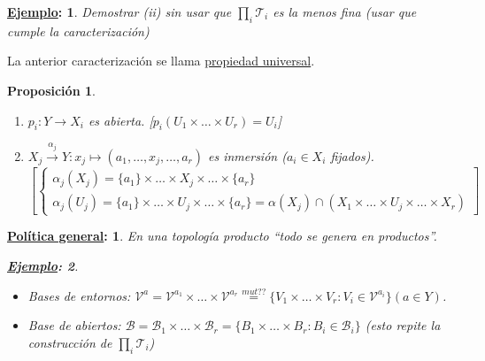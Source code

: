 \documentclass[10pt,a4paper,openright]{book}
\theoremstyle{break}
\newtheorem*{prop}{Proposición}
\newtheorem*{ej}{\underline{Ejemplo}:}
\newtheorem*{pg}{\underline{Política general}:}
\begin{document}
\begin{ej}
Demostrar (ii) sin usar que $\prod_{i} \mathcal{T}_i$ es la menos fina (usar que cumple la caracterización)
\end{ej}

La anterior caracterización se llama \underline{propiedad universal}.

\begin{prop}
\begin{enumerate}
    \item $p_i: Y \rightarrow X_i$ es abierta. [$p_i\left( U_1 \times \ldots \times U_r \right) = U_i$]
    \item $X_j \xrightarrow{\alpha_j} Y: x_j \mapsto \left( a_1, \ldots, x_j, \ldots, a_r \right)$ es inmersión ($a_i \in X_i$ fijados).
    \[
    \left[\begin{cases}
        \alpha_j\left( X_j \right) = \{a_1\} \times \ldots \times X_j \times \ldots \times \{a_r\} \\
        \alpha_j\left( U_j \right) = \{a_1\} \times \ldots \times U_j \times \ldots \times \{a_r\} = \alpha\left( X_j \right) \cap \left( X_1 \times \ldots \times U_j \times \ldots \times X_r \right) 
    \end{cases}\right]     
    \]
\end{enumerate}
\end{prop}

\begin{pg}
En una topología producto ``todo se genera en productos''.
\begin{ej}
\begin{itemize}
    \item Bases de entornos: $\mathcal{V}^a = \mathcal{V}^{a_1} \times \ldots \times \mathcal{V}^{a_r} \stackrel{mut??}{=} \{V_1 \times \ldots \times V_r: V_i \in \mathcal{V}^{a_i}\} \left( a \in Y \right)$.
    \item Base de abiertos: $\mathcal{B} = \mathcal{B}_1 \times \ldots \times \mathcal{B}_r = \{B_1 \times \ldots \times B_r: B_i \in \mathcal{B}_i\}$ (esto repite la construcción de $\prod_{i} \mathcal{T}_i$)
\end{itemize}
\end{ej}
\end{pg}
\end{document}
